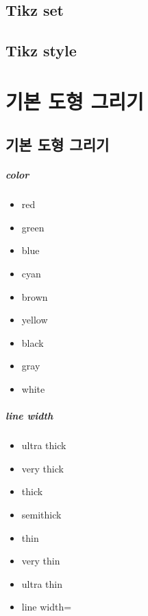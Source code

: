 \documentclass[12pt, a4paper, oneside]{book}
\let\stdsection\section
\renewcommand\section{\newpage\stdsection}
\begin{document}
	\section{Tikz set}


	\section{Tikz style}



	\chapter{기본 도형 그리기}
	\clearpage
	\minitoc				%
	

	\section{기본 도형 그리기}


		\paragraph{color}

			\begin{itemize}
			\item	red
			\item	green
			\item	blue
			\item	cyan
			\item	brown
			\item	yellow
			\item	black
			\item	gray
			\item	white
			\end{itemize}

		\paragraph{line width}

			\begin{itemize}
			\item	ultra thick
			\item	very thick
			\item	thick
			\item	semithick
			\item	thin
			\item	very thin
			\item	ultra thin
			\item	line width=
			\end{itemize}
\end{document}
